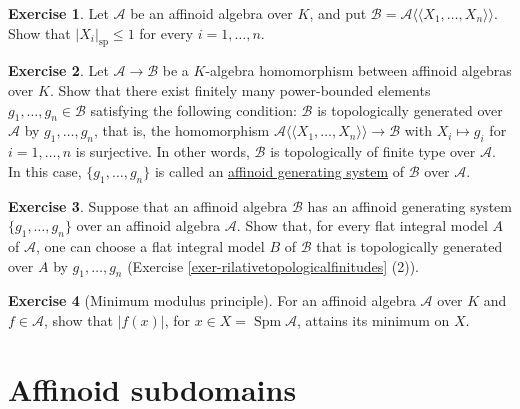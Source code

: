\documentclass[a4paper,12pt, dvipdfmx]{jsbook}
\def\sp{\mathop{\mathrm{sp}}\nolimits}
\def\Spm{\mathop{\mathrm{Spm}}\nolimits}
\def\dl{\langle\!\langle}
\def\dr{\rangle\!\rangle}
\newcommand{\abs}[1]{\lvert#1\rvert}
\theoremstyle{plain}
\theoremstyle{definition}
\newtheorem{exer}{\bfseries Exercise}[chapter]
\newcounter{chushaku}
\begin{document}
\begin{exer}\label{exer-spectralnormcoordinates}{\rm 
Let $\mathcal{A}$ be an affinoid algebra over $K$, and put $\mathcal{B}=\mathcal{A}\dl X_1,\ldots,X_n\dr$.
Show that $\abs{X_i}_{\sp}\leq 1$ for every $i=1,\ldots,n$.}
\end{exer}

\begin{exer}\label{exer-affinoidalgebrageneratingfamily}{\rm 
Let $\mathcal{A}\rightarrow\mathcal{B}$ be a $K$-algebra homomorphism between affinoid algebras over $K$.
Show that there exist finitely many power-bounded elements $g_1,\ldots,g_n\in\mathcal{B}$ satisfying the following condition: $\mathcal{B}$ is topologically generated over $\mathcal{A}$ by $g_1,\ldots,g_n$, that is, the homomorphism $\mathcal{A}\dl X_1,\ldots,X_n\dr\rightarrow\mathcal{B}$ with $X_i\mapsto g_i$ for $i=1,\ldots,n$ is surjective. In other words, $\mathcal{B}$ is topologically of finite type over $\mathcal{A}$.
In this case, $\{g_1,\ldots,g_n\}$ is called an \underline{affinoid generating system} of $\mathcal{B}$ over $\mathcal{A}$.}
\end{exer}

\begin{exer}\label{exer-affinoidalgebrageneratingfamily2}{\rm 
Suppose that an affinoid algebra $\mathcal{B}$ has an affinoid generating system $\{g_1,\ldots,g_n\}$ over an affinoid algebra $\mathcal{A}$.
Show that, for every flat integral model $A$ of $\mathcal{A}$, one can choose a flat integral model $B$ of $\mathcal{B}$ that is topologically generated over $A$ by $g_1,\ldots,g_n$ (Exercise \ref{exer-rilativetopologicalfinitudes} (2)).}
\end{exer}

\begin{exer}[Minimum modulus principle]\label{exer-minimalmodulusprinciple}{\rm {}
For an affinoid algebra $\mathcal{A}$ over $K$ and $f\in\mathcal{A}$, show that $\abs{f(x)}$, for $x\in X=\Spm\mathcal{A}$, attains its minimum on $X$.}
\end{exer}









\setcounter{chushaku}{0}
\chapter{Affinoid subdomains}\label{CH-AFFINOIDSUBDOMAINS}
\end{document}
